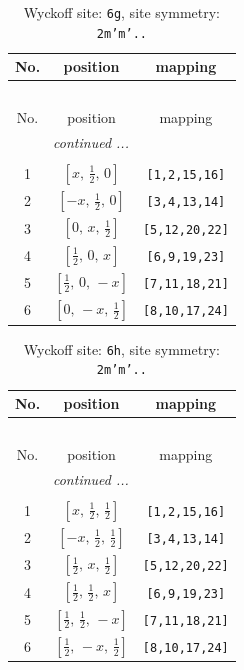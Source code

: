 \documentclass[fleqn,8pt]{jsarticle}
\begin{document}
\renewcommand{\arraystretch}{1.2}
\begin{longtable}{ccc}
\caption{Wyckoff site: {\tt 6g}, site symmetry: {\tt 2m'm'..}}
 \\
 \hline \hline
No. & position & mapping \\ \hline \endfirsthead

\multicolumn{2}{l}{\tablename\ \thetable{}} \\
 \hline \hline
No. & position & mapping \\ \hline \endhead

 \hline \hline
\multicolumn{2}{r}{\footnotesize\it continued ...} \\ \endfoot

 \hline \hline
\multicolumn{2}{r}{} \\ \endlastfoot

1 & $\left[ x,\, \frac{1}{2},\, 0 \right]$ & {\tt [1,2,15,16]} \\ \hline
2 & $\left[ - x,\, \frac{1}{2},\, 0 \right]$ & {\tt [3,4,13,14]} \\ \hline
3 & $\left[ 0,\, x,\, \frac{1}{2} \right]$ & {\tt [5,12,20,22]} \\ \hline
4 & $\left[ \frac{1}{2},\, 0,\, x \right]$ & {\tt [6,9,19,23]} \\ \hline
5 & $\left[ \frac{1}{2},\, 0,\, - x \right]$ & {\tt [7,11,18,21]} \\ \hline
6 & $\left[ 0,\, - x,\, \frac{1}{2} \right]$ & {\tt [8,10,17,24]} \\
\end{longtable}
\renewcommand{\arraystretch}{1.2}
\begin{longtable}{ccc}
\caption{Wyckoff site: {\tt 6h}, site symmetry: {\tt 2m'm'..}}
 \\
 \hline \hline
No. & position & mapping \\ \hline \endfirsthead

\multicolumn{2}{l}{\tablename\ \thetable{}} \\
 \hline \hline
No. & position & mapping \\ \hline \endhead

 \hline \hline
\multicolumn{2}{r}{\footnotesize\it continued ...} \\ \endfoot

 \hline \hline
\multicolumn{2}{r}{} \\ \endlastfoot

1 & $\left[ x,\, \frac{1}{2},\, \frac{1}{2} \right]$ & {\tt [1,2,15,16]} \\ \hline
2 & $\left[ - x,\, \frac{1}{2},\, \frac{1}{2} \right]$ & {\tt [3,4,13,14]} \\ \hline
3 & $\left[ \frac{1}{2},\, x,\, \frac{1}{2} \right]$ & {\tt [5,12,20,22]} \\ \hline
4 & $\left[ \frac{1}{2},\, \frac{1}{2},\, x \right]$ & {\tt [6,9,19,23]} \\ \hline
5 & $\left[ \frac{1}{2},\, \frac{1}{2},\, - x \right]$ & {\tt [7,11,18,21]} \\ \hline
6 & $\left[ \frac{1}{2},\, - x,\, \frac{1}{2} \right]$ & {\tt [8,10,17,24]} \\
\end{longtable}
\end{document}
